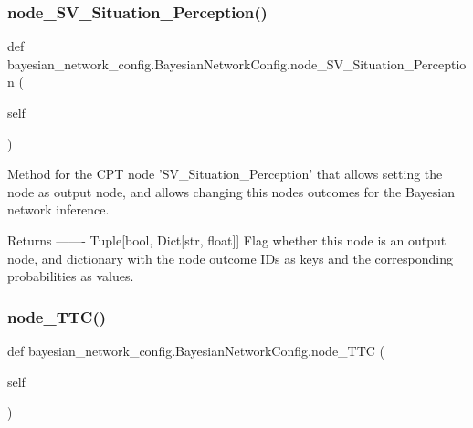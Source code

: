 \subsubsection{\texorpdfstring{node\+\_\+\+S\+V\+\_\+\+Situation\+\_\+\+Perception()}{node\_SV\_Situation\_Perception()}\hspace{0.1cm}{\footnotesize\ttfamily [2/2]}}
{\footnotesize\ttfamily def bayesian\+\_\+network\+\_\+config.\+Bayesian\+Network\+Config.\+node\+\_\+\+S\+V\+\_\+\+Situation\+\_\+\+Perception (\begin{DoxyParamCaption}\item[{}]{self }\end{DoxyParamCaption})}

\begin{DoxyVerb}Method for the CPT node 'SV_Situation_Perception' that allows setting the node as output node, 
and allows changing this nodes outcomes for the Bayesian network inference.

Returns
-------
Tuple[bool, Dict[str, float]]
    Flag whether this node is an output node, and dictionary with the node outcome IDs as keys 
    and the corresponding probabilities as values.
\end{DoxyVerb}
 \mbox{\label{classbayesian__network__config_1_1_bayesian_network_config_a49f488a98830cd4781609a426aab8f7c}} 
\subsubsection{\texorpdfstring{node\+\_\+\+T\+T\+C()}{node\_TTC()}}
{\footnotesize\ttfamily def bayesian\+\_\+network\+\_\+config.\+Bayesian\+Network\+Config.\+node\+\_\+\+T\+TC (\begin{DoxyParamCaption}\item[{}]{self }\end{DoxyParamCaption})}

